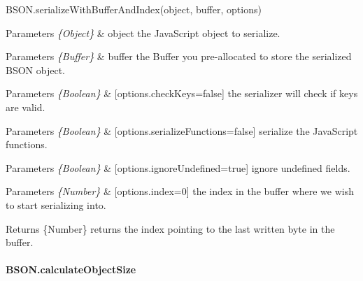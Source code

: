\begin{DoxyItemize}
\item {\ttfamily B\+S\+O\+N.\+serialize\+With\+Buffer\+And\+Index(object, buffer, options)}
\begin{DoxyItemize}
\item 
\begin{DoxyParams}{Parameters}
{\em \{\+Object\}} & object the Java\+Script object to serialize.\\
\hline
\end{DoxyParams}

\item 
\begin{DoxyParams}{Parameters}
{\em \{\+Buffer\}} & buffer the Buffer you pre-\/allocated to store the serialized B\+S\+ON object.\\
\hline
\end{DoxyParams}

\item 
\begin{DoxyParams}{Parameters}
{\em \{\+Boolean\}} & \mbox{[}options.\+check\+Keys=false\mbox{]} the serializer will check if keys are valid.\\
\hline
\end{DoxyParams}

\item 
\begin{DoxyParams}{Parameters}
{\em \{\+Boolean\}} & \mbox{[}options.\+serialize\+Functions=false\mbox{]} serialize the Java\+Script functions.\\
\hline
\end{DoxyParams}

\item 
\begin{DoxyParams}{Parameters}
{\em \{\+Boolean\}} & \mbox{[}options.\+ignore\+Undefined=true\mbox{]} ignore undefined fields.\\
\hline
\end{DoxyParams}

\item 
\begin{DoxyParams}{Parameters}
{\em \{\+Number\}} & \mbox{[}options.\+index=0\mbox{]} the index in the buffer where we wish to start serializing into.\\
\hline
\end{DoxyParams}

\item \begin{DoxyReturn}{Returns}
\{Number\} returns the index pointing to the last written byte in the buffer.
\end{DoxyReturn}
\paragraph*{B\+S\+O\+N.\+calculate\+Object\+Size}
\end{DoxyItemize}
\end{DoxyItemize}

